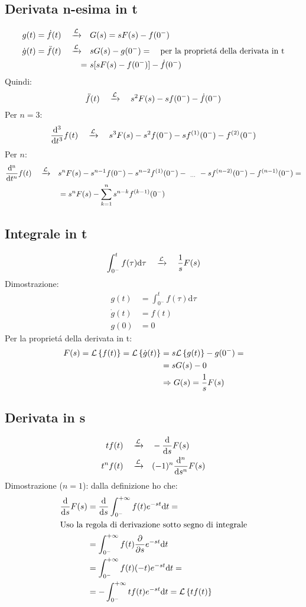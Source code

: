 \documentclass[../main.tex]{subfiles}
\begin{document}
	\subsection{Derivata n-esima in t}
	\label{deriv_n_t}
	\begin{align*}
		g(t)=\dot{f}(t) \quad \xrightarrow{\mathcal{L}} \quad &G(s) = sF(s) - f(0^{-})\\
		\dot{g}(t) = \ddot{f}(t) \quad \xrightarrow{\mathcal{L}} \quad &sG(s) - g(0^{-})= \quad \text{per la propriet\'{a} della derivata in t}\\
		=\ &s[sF(s) - f(0^{-})] - \dot{f}(0^{-})\\
	\end{align*}
	Quindi:
	$$ \ddot{f}(t) \quad \xrightarrow{\mathcal{L}} \quad s^2 F(s) - s f(0^{-}) - \dot{f}(0^{-}) $$
	\linebreak
	Per $n=3$:
	$$ \frac{\mathrm{d^3}}{\mathrm{d}t^3}f(t) \quad \xrightarrow{\mathcal{L}} \quad s^3 F(s) - s^2 f(0^{-}) - s f^{(1)}(0^{-}) - f^{(2)}(0^{-}) $$
	\linebreak
	Per $n$:
	\begin{align*}
		\frac{\mathrm{d^n}}{\mathrm{d}t^n}f(t) \quad \xrightarrow{\mathcal{L}} \quad &s^n F(s) - s^{n-1} f(0^{-}) - s^{n-2} f^{(1)}(0^{-}) -\ _{\dots}\ - s f^{(n-2)}(0^{-}) - f^{(n-1)}(0^{-}) = \\
		&= s^n F(s) - \sum_{k = 1}^{n} s^{n-k} f^{(k - 1)}(0^{-})
	\end{align*}
	\subsection{Integrale in t}
	\label{int_t}
	$$ \int_{0^{-}}^{t} f(\tau) \mathrm{d}\tau \quad \xrightarrow{\mathcal{L}} \quad \frac{1}{s} F(s) $$
	Dimostrazione:
	\begin{align*}
		g(t) &= \int_{0^{-}}^{t} f(\tau) \mathrm{d}\tau\\
		\dot{g}(t) &= f(t)\\
		g(0) &= 0
	\end{align*}
	Per la propriet\'{a} della derivata in t:
	\begin{align*}
		F(s) = \mathcal{L} \left\lbrace f(t) \right\rbrace = \mathcal{L} \left\lbrace \dot{g}(t) \right\rbrace &= s \mathcal{L} \left\lbrace g(t) \right\rbrace - g(0^{-}) = \\
		&= s G(s) - 0\\
		&\Rightarrow G(s) = \frac{1}{s} F(s)
	\end{align*}
	\subsection{Derivata in s}
	\label{deriv_s}
	\begin{align*}
	t f(t) \quad \xrightarrow{\mathcal{L}} \quad &- \frac{\mathrm{d}}{\mathrm{d}s} F(s)\\
	t^n f(t) \quad \xrightarrow{\mathcal{L}} \quad &(-1)^n \frac{\mathrm{d}^n}{\mathrm{d}s^n} F(s)
	\end{align*}
	Dimostrazione ($n=1$): dalla definizione ho che:
	\begin{align*}
		\frac{\mathrm{d}}{\mathrm{d}s} F(s) & = \frac{\mathrm{d}}{\mathrm{d}s} \int_{0^{-}}^{+\infty} f(t) e^{- s t} \mathrm{d} t =\\
		\intertext{Uso la regola di derivazione sotto segno di integrale}
		& = \int_{0^{-}}^{+\infty} f(t) \frac{\partial }{\partial s} e^{- s t} \mathrm{d} t\\
		& = \int_{0^{-}}^{+\infty} f(t)(-t) e^{- s t} \mathrm{d} t =\\
		& = - \int_{0^{-}}^{+\infty} t f(t) e^{- s t} \mathrm{d} t=\mathcal{L} \left\lbrace t f(t) \right\rbrace
	\end{align*}
\end{document}
